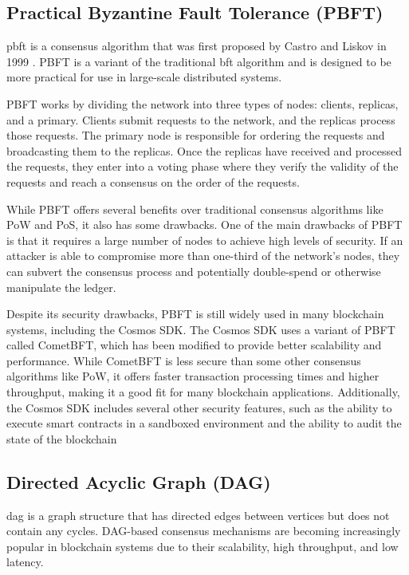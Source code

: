 \subsection{Practical Byzantine Fault Tolerance (PBFT)}

\gls{pbft} is a consensus algorithm that was first proposed by Castro and Liskov in 1999 \cite{castro1999practical}. PBFT is a variant of the traditional \gls{bft} algorithm and is designed to be more practical for use in large-scale distributed systems.

PBFT works by dividing the network into three types of nodes: clients, replicas, and a primary. Clients submit requests to the network, and the replicas process those requests. The primary node is responsible for ordering the requests and broadcasting them to the replicas. Once the replicas have received and processed the requests, they enter into a voting phase where they verify the validity of the requests and reach a consensus on the order of the requests.

While PBFT offers several benefits over traditional consensus algorithms like PoW and PoS, it also has some drawbacks. One of the main drawbacks of PBFT is that it requires a large number of nodes to achieve high levels of security. If an attacker is able to compromise more than one-third of the network's nodes, they can subvert the consensus process and potentially double-spend or otherwise manipulate the ledger.

Despite its security drawbacks, PBFT is still widely used in many blockchain systems, including the Cosmos SDK. The Cosmos SDK uses a variant of PBFT called CometBFT, which has been modified to provide better scalability and performance. While CometBFT is less secure than some other consensus algorithms like PoW, it offers faster transaction processing times and higher throughput, making it a good fit for many blockchain applications. Additionally, the Cosmos SDK includes several other security features, such as the ability to execute smart contracts in a sandboxed environment and the ability to audit the state of the blockchain

\subsection{Directed Acyclic Graph (DAG)}

\gls{dag} is a graph structure that has directed edges between vertices but does not contain any cycles. DAG-based consensus mechanisms are becoming increasingly popular in blockchain systems due to their scalability, high throughput, and low latency.

